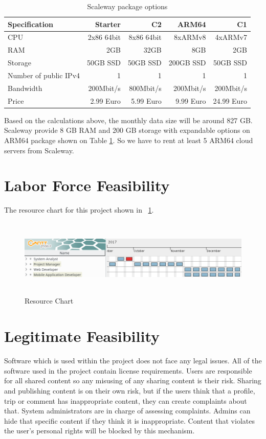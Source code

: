 \begin{table}[!ht]
\centering
\caption{Scaleway package options \cite{scaleway}}
\label{scaleway}
\begin{tabular}{|l|r|r|r|r|}
\hline
\textbf{Specification}& \textbf{Starter} & \textbf{C2}  & \textbf{ARM64} & \textbf{C1} \\ \hline
CPU                             & 2x86 64bit & 8x86 64bit  & 8xARMv8 & 4xARMv7 \\ \hline
RAM                             & 2GB & 32GB & 8GB & 2GB \\ \hline
Storage                         & 50GB SSD & 50GB SSD & 200GB SSD & 50GB SSD \\ \hline
Number of public IPv4  & 1 & 1 & 1 & 1  \\ \hline
Bandwidth                       & 200Mbit/s & 800Mbit/s & 200Mbit/s & 200Mbit/s \\ \hline
Price                       & 2.99 Euro & 5.99 Euro & 9.99 Euro & 24.99 Euro \\ \hline
\end{tabular}
\end{table}

Based on the calculations above, the monthly data size will be around 827 GB. Scaleway provide 8 GB RAM and 200 GB storage with expandable options on ARM64 package shown on Table \ref{scaleway}. So we have to rent at least 5 ARM64 cloud servers from Scaleway.

\section{Labor Force Feasibility}
The resource chart for this project shown in ~\ref{fig:resource}.

\begin{figure}[!htbp]
\centering
\includegraphics[width=\textwidth, height=10em]{projectChapters/images/resource.png}
\caption{Resource Chart}
\label{fig:resource}
\end{figure}

\section{Legitimate Feasibility}
Software which is used within the project does not face any legal issues. All of the
software used in the project contain license requirements. Users are responsible for
all shared content so any misusing of any sharing content is their risk. Sharing and publishing content is on their own risk, but if the users think that a profile, trip or comment has inappropriate content, they can create complaints about that. System administrators are in charge of assessing complaints. Admins can hide that specific content if they think it is inappropriate. Content that violates the user's personal rights will be blocked by this mechanism.

